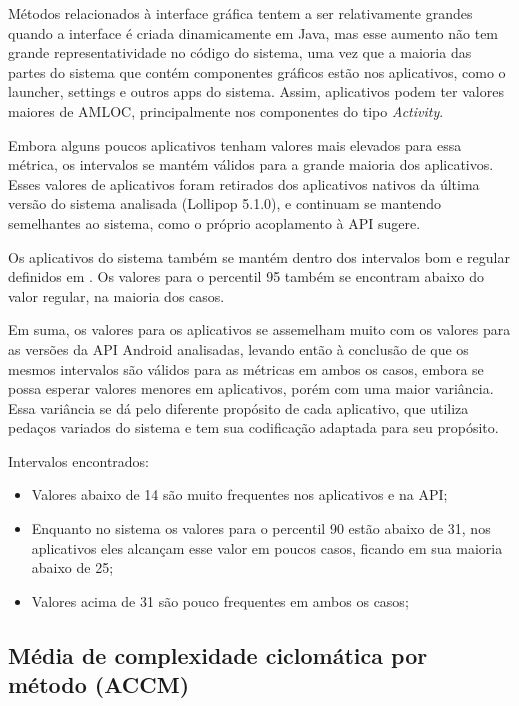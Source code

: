 Métodos relacionados à interface gráfica tentem a ser relativamente grandes quando a interface é criada dinamicamente em Java, mas esse aumento não tem grande representatividade no código do sistema, uma vez que a maioria das partes do sistema que contém componentes gráficos estão nos aplicativos, como o launcher, settings e outros apps do sistema. Assim, aplicativos podem ter valores maiores de AMLOC, principalmente nos componentes do tipo \textit{Activity}.

Embora alguns poucos aplicativos tenham valores mais elevados para essa métrica, os intervalos se mantém válidos para a grande maioria dos aplicativos. Esses valores de aplicativos foram retirados dos aplicativos nativos da última versão do sistema analisada (Lollipop 5.1.0), e continuam se mantendo semelhantes ao sistema, como o próprio acoplamento à API sugere. 

Os aplicativos do sistema também se mantém dentro dos intervalos bom e regular definidos em . Os valores para o percentil 95 também se encontram abaixo do valor regular, na maioria dos casos.

Em suma, os valores para os aplicativos se assemelham muito com os valores para as versões da API Android analisadas, levando então à conclusão de que os mesmos intervalos são válidos para as métricas em ambos os casos, embora se possa esperar valores menores em aplicativos, porém com uma maior variância. Essa variância se dá pelo diferente propósito de cada aplicativo, que utiliza pedaços variados do sistema e tem sua codificação adaptada para seu propósito.

Intervalos encontrados:

\begin{itemize}
\item Valores abaixo de 14 são muito frequentes nos aplicativos e na API;
\item Enquanto no sistema os valores para o percentil 90 estão abaixo de 31, nos aplicativos eles alcançam esse valor em poucos casos, ficando em sua maioria abaixo de 25;
\item Valores acima de 31 são pouco frequentes em ambos os casos;
\end{itemize}

\subsection{Média de complexidade ciclomática por método (ACCM)}

